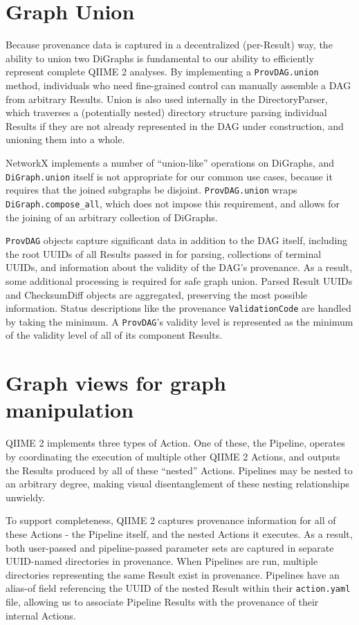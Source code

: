 \section{Graph Union}

Because provenance data is captured in a decentralized (per-Result) way, the
ability to union two DiGraphs is fundamental to our ability to efficiently
represent complete QIIME 2 analyses. By implementing a \texttt{ProvDAG.union} method,
individuals who need fine-grained control can manually assemble a DAG from
arbitrary Results. Union is also used internally in the DirectoryParser, which
traverses a (potentially nested) directory structure parsing individual Results
if they are not already represented in the DAG under construction, and unioning
them into a whole.

NetworkX implements a number of “union-like” operations on DiGraphs, and
\texttt{DiGraph.union} itself is not appropriate for our common use cases, because it
requires that the joined subgraphs be disjoint. \texttt{ProvDAG.union} wraps
\texttt{DiGraph.compose\_all}, which does not impose this requirement, and allows for the
joining of an arbitrary collection of DiGraphs.

\texttt{ProvDAG} objects capture significant data in addition to the DAG itself,
including the root UUIDs of all Results passed in for parsing, collections of
terminal UUIDs, and information about the validity of the DAG’s provenance. As a
result, some additional processing is required for safe graph union. Parsed
Result UUIDs and ChecksumDiff objects are aggregated, preserving the most
possible information. Status descriptions like the provenance \texttt{ValidationCode} are
handled by taking the minimum. A \texttt{ProvDAG}'s validity level is represented as the
minimum of the validity level of all of its component Results.


\section{Graph views for graph manipulation}

QIIME 2 implements three types of Action. One of these, the Pipeline, operates
by coordinating the execution of multiple other QIIME 2 Actions, and outputs the
Results produced by all of these “nested” Actions. Pipelines may be nested to an
arbitrary degree, making visual disentanglement of these nesting relationships
unwieldy.

To support completeness, QIIME 2 captures provenance information for all of
these Actions - the Pipeline itself, and the nested Actions it executes. As a
result, both user-passed and pipeline-passed parameter sets are captured in
separate UUID-named directories in provenance. When Pipelines are run, multiple
directories representing the same Result exist in provenance. Pipelines have an
alias-of field referencing the UUID of the nested Result within their
\texttt{action.yaml} file, allowing us to associate Pipeline Results with the provenance
of their internal Actions. 

